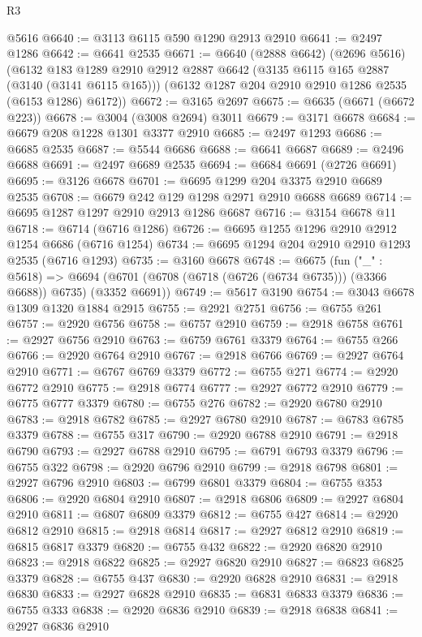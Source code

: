 \begin{lexlean}{R3}
\begin{coremodule}
    @5616
@6640 := @3113 @6115 @590 @1290 @2913 @2910
@6641 := @2497 @1286
@6642 := @6641 @2535
@6671 := @6640
    (@2888 @6642)
    (@2696 @5616)
    (@6132
      @183
      @1289
      @2910
      @2912
      @2887
      @6642
      (@3135 @6115 @165 @2887 (@3140 (@3141 @6115 @165)))
      (@6132 @1287 @204 @2910 @2910 @1286 @2535 (@6153 @1286) @6172))
@6672 := @3165 @2697
@6675 := @6635 (@6671 (@6672 @223))
@6678 := @3004 (@3008 @2694) @3011
@6679 := @3171 @6678
@6684 := @6679 @208 @1228 @1301 @3377 @2910
@6685 := @2497 @1293
@6686 := @6685 @2535
@6687 := @5544 @6686
@6688 := @6641 @6687
@6689 := @2496 @6688
@6691 := @2497 @6689 @2535
@6694 := @6684 @6691 (@2726 @6691)
@6695 := @3126 @6678
@6701 := @6695 @1299 @204 @3375 @2910 @6689 @2535
@6708 := @6679 @242 @129 @1298 @2971 @2910 @6688 @6689
@6714 := @6695 @1287 @1297 @2910 @2913 @1286 @6687
@6716 := @3154 @6678 @11
@6718 := @6714 (@6716 @1286)
@6726 := @6695 @1255 @1296 @2910 @2912 @1254 @6686 (@6716 @1254)
@6734 := @6695 @1294 @204 @2910 @2910 @1293 @2535 (@6716 @1293)
@6735 := @3160 @6678
@6748 := @6675
    (fun ("_" : @5618) =>
    @6694 (@6701 (@6708 (@6718 (@6726 (@6734 @6735))) (@3366 @6688)) @6735) (@3352 @6691))
@6749 := @5617 @3190
@6754 := @3043 @6678 @1309 @1320 @1884 @2915
@6755 := @2921 @2751
@6756 := @6755 @261
@6757 := @2920 @6756
@6758 := @6757 @2910
@6759 := @2918 @6758
@6761 := @2927 @6756 @2910
@6763 := @6759 @6761 @3379
@6764 := @6755 @266
@6766 := @2920 @6764 @2910
@6767 := @2918 @6766
@6769 := @2927 @6764 @2910
@6771 := @6767 @6769 @3379
@6772 := @6755 @271
@6774 := @2920 @6772 @2910
@6775 := @2918 @6774
@6777 := @2927 @6772 @2910
@6779 := @6775 @6777 @3379
@6780 := @6755 @276
@6782 := @2920 @6780 @2910
@6783 := @2918 @6782
@6785 := @2927 @6780 @2910
@6787 := @6783 @6785 @3379
@6788 := @6755 @317
@6790 := @2920 @6788 @2910
@6791 := @2918 @6790
@6793 := @2927 @6788 @2910
@6795 := @6791 @6793 @3379
@6796 := @6755 @322
@6798 := @2920 @6796 @2910
@6799 := @2918 @6798
@6801 := @2927 @6796 @2910
@6803 := @6799 @6801 @3379
@6804 := @6755 @353
@6806 := @2920 @6804 @2910
@6807 := @2918 @6806
@6809 := @2927 @6804 @2910
@6811 := @6807 @6809 @3379
@6812 := @6755 @427
@6814 := @2920 @6812 @2910
@6815 := @2918 @6814
@6817 := @2927 @6812 @2910
@6819 := @6815 @6817 @3379
@6820 := @6755 @432
@6822 := @2920 @6820 @2910
@6823 := @2918 @6822
@6825 := @2927 @6820 @2910
@6827 := @6823 @6825 @3379
@6828 := @6755 @437
@6830 := @2920 @6828 @2910
@6831 := @2918 @6830
@6833 := @2927 @6828 @2910
@6835 := @6831 @6833 @3379
@6836 := @6755 @333
@6838 := @2920 @6836 @2910
@6839 := @2918 @6838
@6841 := @2927 @6836 @2910

\end{coremodule}
\end{lexlean}
